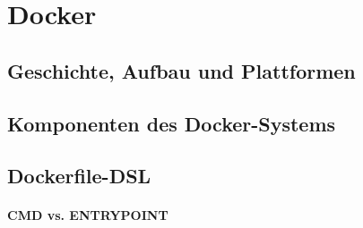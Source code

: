 
\chapter{Docker}
\label{cha:docker}
\section{Geschichte, Aufbau und Plattformen}
\label{sec:docker-basics}
\section{Komponenten des Docker-Systems}
\label{sec:docker-komponenten}
\section{Dockerfile-DSL}
\label{sec:dockerfiles}
\subsubsection{CMD vs. ENTRYPOINT}

